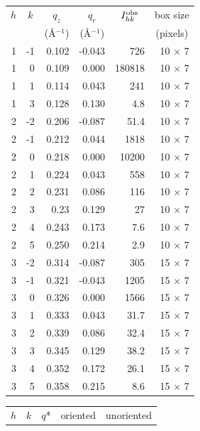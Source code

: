 \begin{table}[htbp]
  \centering
  \begin{tabular}{rrrrrr}
    \hline
    \multicolumn{1}{c}{$h$} & \multicolumn{1}{c}{$k$} & \multicolumn{1}{c}{$q_z$} & \multicolumn{1}{c}{$q_r$} & \multicolumn{1}{c}{$I_{hk}^\textrm{obs}$} & \multicolumn{1}{c}{box size} \\
     & & \multicolumn{1}{c}{(\AA$^{-1}$)} & \multicolumn{1}{c}{(\AA$^{-1}$)} & & \multicolumn{1}{c}{(pixels)} \\ 
    \hline
    1 & -1 & 0.102 &-0.043 & 726 & 10 $\times$ 7 \\
    1 &  0 & 0.109 &0.000 & 180818 & 10 $\times$ 7 \\
    1 &  1 & 0.114 &0.043 &    241 & 10 $\times$ 7 \\
    1 &  3 & 0.128 &0.130 &	   4.8 & 10 $\times$ 7 \\
    2 & -2 & 0.206 &-0.087 &	  51.4 & 10 $\times$ 7 \\
    2 & -1 & 0.212 &0.044&	  1818 & 10 $\times$ 7 \\
    2 &  0 & 0.218 &0.000&10200 & 10 $\times$ 7 \\
    2 &  1&0.224&0.043&558 & 10 $\times$ 7 \\
    2 &  2&0.231&0.086&116& 10 $\times$ 7 \\
    2 &  3 & 0.23  &  0.129 &	    27 & 10 $\times$ 7 \\
    2 &  4 & 0.243 &  0.173 &    7.6 & 10 $\times$ 7 \\
    2 &  5 & 0.250 &  0.214 &    2.9 & 10 $\times$ 7 \\
    3 &	-2 & 0.314 & -0.087 & 305 & 15 $\times$ 7 \\
    3 & -1 & 0.321 & -0.043	&   1205 & 15 $\times$ 7 \\
    3 &  0 & 0.326 &  0.000 & 1566 & 15 $\times$ 7 \\
    3 &  1 & 0.333 &  0.043 &   31.7 & 15 $\times$ 7 \\
    3 &  2 & 0.339 &  0.086 &   32.4 & 15 $\times$ 7 \\
    3 &  3 & 0.345 &  0.129 &	  38.2 & 15 $\times$ 7 \\
    3 &  4 & 0.352 &  0.172 &	  26.1 & 15 $\times$ 7 \\
    3 &  5 & 0.358 &  0.215 &	   8.6 & 15 $\times$ 7 \\
    \hline
  \end{tabular}
  \begin{tabular}{rrrrr}
    \hline
    \multicolumn{1}{c}{$h$} & \multicolumn{1}{c}{$k$} & \multicolumn{1}{c}{$q$*}& \multicolumn{1}{c}{oriented} & \multicolumn{1}{c}{unoriented} \\

\end{tabular}
\end{table}
